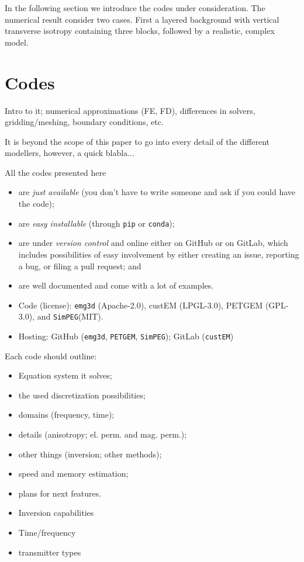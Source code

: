 \documentclass[
    paper,
  ]{geophysics}
\newcommand{\emg}[2]{\texttt{emg#1#2}\xspace}
\newcommand{\simpeg}{\texttt{SimPEG}\xspace}
\newcommand{\custem}{\texttt{custEM}\xspace}
\newcommand{\petgem}{\texttt{PETGEM}\xspace}
\begin{document}
In the following section we introduce the codes under consideration. The
numerical result consider two cases. First a layered background with vertical
transverse isotropy containing three blocks, followed by a realistic, complex
model.

\section{Codes}

Intro to it; numerical approximations (FE, FD), differences in solvers,
gridding/meshing, boundary conditions, etc.

It is beyond the scope of this paper to go into every detail of the different
modellers, however, a quick blabla...

All the codes presented here
\begin{itemize}
  \item are \emph{just available} (you don't have to write someone and ask if
    you could have the code);
  \item are \emph{easy installable} (through \texttt{pip} or \texttt{conda});
  \item are under \emph{version control} and online either on GitHub or on
    GitLab, which includes possibilities of easy involvement by either creating
    an issue, reporting a bug, or filing a pull request; and
  \item are well documented and come with a lot of examples.
\end{itemize}

\begin{itemize}
  \item Code (license): \emg3d (Apache-2.0), custEM (LPGL-3.0), PETGEM
    (GPL-3.0), and \simpeg (MIT).
  \item Hosting: GitHub (\emg3d, \petgem, \simpeg); GitLab (\custem)
\end{itemize}




Each code should outline:

\begin{itemize}
  \item Equation system it solves;
  \item the used discretization possibilities;
  \item domains (frequency, time);
  \item details (anisotropy; el. perm. and mag. perm.);
  \item other things (inversion; other methods);
  \item speed and memory estimation;
  \item plans for next features.
  \item Inversion capabilities
  \item Time/frequency
  \item transmitter types
\end{itemize}
\end{document}
